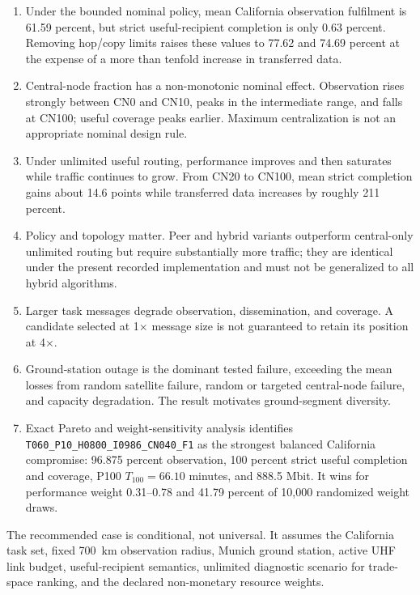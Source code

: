 \begin{enumerate}
\item Under the bounded nominal policy, mean California observation fulfilment is 61.59 percent, but strict useful-recipient completion is only 0.63 percent. Removing hop/copy limits raises these values to 77.62 and 74.69 percent at the expense of a more than tenfold increase in transferred data.
\item Central-node fraction has a non-monotonic nominal effect. Observation rises strongly between CN0 and CN10, peaks in the intermediate range, and falls at CN100; useful coverage peaks earlier. Maximum centralization is not an appropriate nominal design rule.
\item Under unlimited useful routing, performance improves and then saturates while traffic continues to grow. From CN20 to CN100, mean strict completion gains about 14.6 points while transferred data increases by roughly 211 percent.
\item Policy and topology matter. Peer and hybrid variants outperform central-only unlimited routing but require substantially more traffic; they are identical under the present recorded implementation and must not be generalized to all hybrid algorithms.
\item Larger task messages degrade observation, dissemination, and coverage. A candidate selected at 1$\times$ message size is not guaranteed to retain its position at 4$\times$.
\item Ground-station outage is the dominant tested failure, exceeding the mean losses from random satellite failure, random or targeted central-node failure, and capacity degradation. The result motivates ground-segment diversity.
\item Exact Pareto and weight-sensitivity analysis identifies \texttt{T060\_P10\_H0800\_I0986\_CN040\_F1} as the strongest balanced California compromise: 96.875 percent observation, 100 percent strict useful completion and coverage, P100 $T_{100}=66.10$ minutes, and 888.5 Mbit. It wins for performance weight 0.31--0.78 and 41.79 percent of 10,000 randomized weight draws.
\end{enumerate}

The recommended case is conditional, not universal. It assumes the California task set, fixed \SI{700}{\kilo\metre} observation radius, Munich ground station, active UHF link budget, useful-recipient semantics, unlimited diagnostic scenario for trade-space ranking, and the declared non-monetary resource weights.

